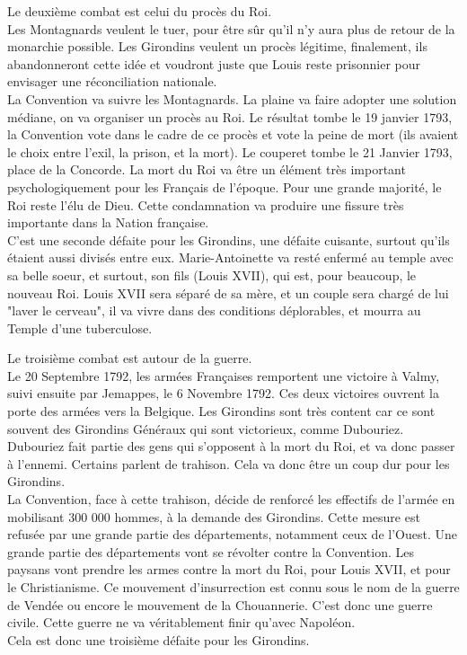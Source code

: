 \documentclass[10pt, a4paper, openany]{book}
\begin{document}
Le deuxième combat est celui du procès du Roi. \\
Les Montagnards veulent le tuer, pour être sûr qu'il n'y aura plus de retour de la monarchie possible. Les Girondins veulent un procès légitime, finalement, ils abandonneront cette idée et voudront juste que Louis reste prisonnier pour envisager une réconciliation nationale. \\
La Convention va suivre les Montagnards. La plaine va faire adopter une solution médiane, on va organiser un procès au Roi. Le résultat tombe le 19 janvier 1793, la Convention vote dans le cadre de ce procès et vote la peine de mort (ils avaient le choix entre l'exil, la prison, et la mort). Le couperet tombe le 21 Janvier 1793, place de la Concorde. La mort du Roi va être un élément très important psychologiquement pour les Français de l'époque. Pour une grande majorité, le Roi reste l'élu de Dieu. Cette condamnation va produire une fissure très importante dans la Nation française. \\
C'est une seconde défaite pour les Girondins, une défaite cuisante, surtout qu'ils étaient aussi divisés entre eux. Marie-Antoinette va resté enfermé au temple avec sa belle soeur, et surtout, son fils (Louis XVII), qui est, pour beaucoup, le nouveau Roi. Louis XVII sera séparé de sa mère, et un couple sera chargé de lui "laver le cerveau", il va vivre dans des conditions déplorables, et mourra au Temple d'une tuberculose. 


Le troisième combat est autour de la guerre. \\
Le 20 Septembre 1792, les armées Françaises remportent une victoire à Valmy, suivi ensuite par Jemappes, le 6 Novembre 1792. Ces deux victoires ouvrent la porte des armées vers la Belgique. Les Girondins sont très content car ce sont souvent des Girondins Généraux qui sont victorieux, comme Dubouriez. \\
Dubouriez fait partie des gens qui s'opposent à la mort du Roi, et va donc passer à l'ennemi. Certains parlent de trahison. Cela va donc être un coup dur pour les Girondins. \\
La Convention, face à cette trahison, décide de renforcé les effectifs de l'armée en mobilisant 300 000 hommes, à la demande des Girondins. Cette mesure est refusée par une grande partie des départements, notamment ceux de l'Ouest. Une grande partie des départements vont se révolter contre la Convention. Les paysans vont prendre les armes contre la mort du Roi, pour Louis XVII, et pour le Christianisme. Ce mouvement d'insurrection est connu sous le nom de la guerre de Vendée ou encore le mouvement de la Chouannerie. C'est donc une guerre civile. Cette guerre ne va véritablement finir qu'avec Napoléon. \\
Cela est donc une troisième défaite pour les Girondins. 
\end{document}
